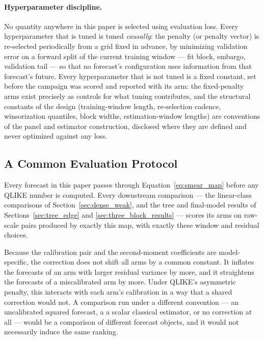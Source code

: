 \paragraph{Hyperparameter discipline.} No quantity anywhere in this paper
is selected using evaluation loss. Every hyperparameter that is tuned is
tuned \emph{causally}: the penalty (or penalty vector) is re-selected
periodically from a grid fixed in advance, by minimizing validation error
on a forward split of the current training window --- fit block, embargo,
validation tail --- so that no forecast's configuration uses information
from that forecast's future. Every hyperparameter that is not tuned is a
fixed constant, set before the campaign was scored and reported with its
arm: the fixed-penalty arms exist precisely as controls for what tuning
contributes, and the structural constants of the design (training-window
length, re-selection cadence, winsorization quantiles, block widths,
estimation-window lengths) are conventions of the panel and estimator
construction, disclosed where they are defined and never optimized against
any loss.

\subsection{A Common Evaluation Protocol}
\label{sec:smearing_contract}

Every forecast in this paper passes through Equation~\eqref{eq:smear_map}
before any QLIKE number is computed. Every downstream comparison --- the
linear-class comparisons of Section~\ref{sec:dense_weak}, and the tree and final-model results of
Sections~\ref{sec:tree_edge} and \ref{sec:three_block_results} --- scores
its arms on raw-scale pairs produced by exactly this map,
with exactly these window and residual choices.

Because the calibration pair and the second-moment coefficients are
model-specific, the correction does not shift all arms by a common
constant. It inflates the forecasts of an arm with larger residual
variance by more, and it straightens the forecasts of a miscalibrated arm
by more. Under QLIKE's asymmetric penalty, this interacts with each arm's
calibration in a way that a shared correction would not. A comparison run
under a different convention --- an uncalibrated squared forecast, a
a scalar classical estimator, or no correction at all --- would be a comparison
of different forecast objects, and it would not necessarily induce the
same ranking.

